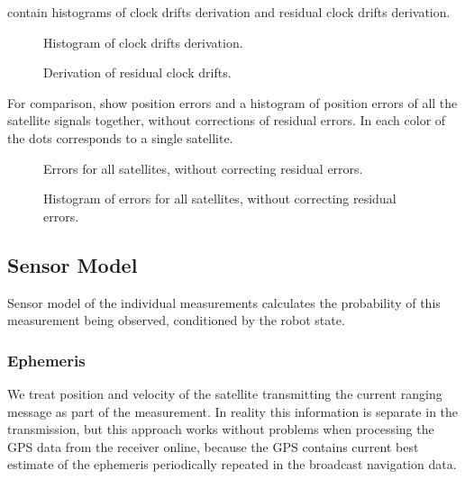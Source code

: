 contain histograms of clock drifts derivation and residual
clock drifts derivation.

\begin{figure}[p]
	\centering
	\noindent{}
	\caption{Histogram of clock drifts derivation.}
	\label{fig:clock-drift-derivation}
\end{figure}

\begin{figure}[p]
	\centering
	\noindent{}
	\caption{Derivation of residual clock drifts.}
	\label{fig:residual-clock-drift-derivation}
\end{figure}

For comparison,  show
position errors and a histogram of position errors of all the satellite signals
together, without corrections of residual errors.
In  each color of the dots corresponds to a single
satellite.

\begin{figure}[p]
	\centering
	\noindent{}
	\caption{Errors for all satellites, without correcting residual errors.}
	\label{fig:errors-global}
\end{figure}

\begin{figure}[p]
	\centering
	\noindent{}
	\caption{Histogram of errors for all satellites, without correcting residual errors.}
	\label{fig:errors-global-histogram}
\end{figure}

\subsection{Sensor Model}
Sensor model of the individual measurements calculates the probability of this
measurement being observed, conditioned by the robot state.

\subsubsection{Ephemeris}
We treat position and velocity of the satellite transmitting
the current ranging message as part of the measurement.
In reality this information is separate in the transmission, but
this approach works without problems when processing the GPS data from the receiver online,
because the GPS contains current best estimate of the ephemeris periodically repeated
in the broadcast navigation data.

